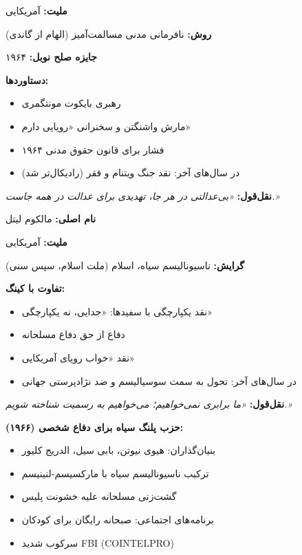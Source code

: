 \begin{personbox}

\textbf{ملیت:} آمریکایی

\textbf{روش:} نافرمانی مدنی مسالمت‌آمیز (الهام از گاندی)

\textbf{جایزه صلح نوبل:} ۱۹۶۴

\mediumspace

\textbf{دستاوردها:}
\begin{itemize}[nosep]
    \item رهبری بایکوت مونتگمری
    \item مارش واشنگتن و سخنرانی «رویایی دارم»
    \item فشار برای قانون حقوق مدنی ۱۹۶۴
    \item در سال‌های آخر: نقد جنگ ویتنام و فقر (رادیکال‌تر شد)
\end{itemize}

\mediumspace

\textbf{نقل‌قول:} \textit{«بی‌عدالتی در هر جا، تهدیدی برای عدالت در همه جاست.»}
\end{personbox}

\begin{personbox}

\textbf{نام اصلی:} مالکوم لیتل

\textbf{ملیت:} آمریکایی

\textbf{گرایش:} ناسیونالیسم سیاه، اسلام (ملت اسلام، سپس سنی)

\mediumspace

\textbf{تفاوت با کینگ:}
\begin{itemize}[nosep]
    \item نقد یکپارچگی با سفیدها: «جدایی، نه یکپارچگی»
    \item دفاع از حق دفاع مسلحانه
    \item نقد «خواب رویای آمریکایی»
    \item در سال‌های آخر: تحول به سمت سوسیالیسم و ضد نژادپرستی جهانی
\end{itemize}

\mediumspace

\textbf{نقل‌قول:} \textit{«ما برابری نمی‌خواهیم؛ می‌خواهیم به رسمیت شناخته شویم.»}
\end{personbox}

\begin{defbox}
\textbf{حزب پلنگ سیاه برای دفاع شخصی (۱۹۶۶):}
\begin{itemize}[nosep]
    \item بنیان‌گذاران: هیوی نیوتن، بابی سیل، الدریج کلیور
    \item ترکیب ناسیونالیسم سیاه با مارکسیسم-لنینیسم
    \item گشت‌زنی مسلحانه علیه خشونت پلیس
    \item برنامه‌های اجتماعی: صبحانه رایگان برای کودکان
    \item سرکوب شدید FBI (COINTELPRO)
\end{itemize}
\end{defbox}

